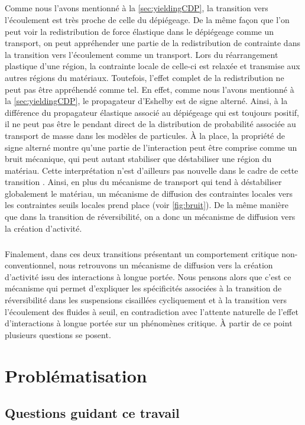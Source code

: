 \subparagraph{}Comme nous l'avons mentionné à la \autoref{sec:yieldingCDP}, la transition vers l'écoulement est très proche de celle du dépiégeage. De la même façon que l'on peut voir la redistribution de force élastique dans le dépiégeage comme un transport, on peut appréhender une partie de la redistribution de contrainte dans la transition vers l'écoulement comme un transport. Lors du réarrangement plastique d'une région, la contrainte locale de celle-ci est relaxée et transmise aux autres régions du matériaux. Toutefois, l'effet complet de la redistribution ne peut pas être appréhendé comme tel. En effet, comme nous l'avons mentionné à la \autoref{sec:yieldingCDP}, le propagateur d'Eshelby est de signe alterné. Ainsi, à la différence du propagateur élastique associé au dépiégeage qui est toujours positif, il ne peut pas être le pendant direct de la distribution de probabilité associée au transport de masse dans les modèles de particules. \`A la place, la propriété de signe alterné montre qu'une partie de l'interaction peut être comprise comme un bruit mécanique, qui peut autant stabiliser que déstabiliser une région du matériau. Cette interprétation n'est d'ailleurs pas nouvelle dans le cadre de cette transition \cite{lin_mean-field_2016, ferrero_criticality_2019}. Ainsi, en plus du mécanisme de transport qui tend à déstabiliser globalement le matériau, un mécanisme de diffusion des contraintes locales vers les contraintes seuils locales prend place (voir \autoref{fig:bruit}). De la même manière que dans la transition de réversibilité, on a donc un mécanisme de diffusion vers la création d'activité.

\subparagraph{}Finalement, dans ces deux transitions présentant un comportement critique non-conventionnel, nous retrouvons un mécanisme de diffusion vers la création d'activité issu des interactions à longue portée. Nous pensons alors que c'est ce mécanisme qui permet d'expliquer les spécificités associées à la transition de réversibilité dans les suspensions cisaillées cycliquement et à la transition vers l'écoulement des fluides à seuil, en contradiction avec l'attente naturelle de l'effet d'interactions à longue portée sur un phénomènes critique. \`A partir de ce point plusieurs questions se posent.

\section{Problématisation}

\subsection{Questions guidant ce travail}


